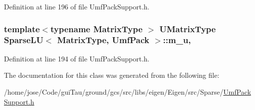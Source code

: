 Definition at line 196 of file Umf\-Pack\-Support.\-h.

\hypertarget{class_sparse_l_u_3_01_matrix_type_00_01_umf_pack_01_4_a59093788300b1912865d3b5d4e492ff6}{
\subsubsection[{m\-\_\-u}]{\setlength{\rightskip}{0pt plus 5cm}template$<$typename Matrix\-Type $>$ {\bf U\-Matrix\-Type} {\bf Sparse\-L\-U}$<$ Matrix\-Type, {\bf Umf\-Pack} $>$\-::m\-\_\-u\hspace{0.3cm}{\ttfamily [mutable]}, {\ttfamily [protected]}}}\label{class_sparse_l_u_3_01_matrix_type_00_01_umf_pack_01_4_a59093788300b1912865d3b5d4e492ff6}


Definition at line 194 of file Umf\-Pack\-Support.\-h.



The documentation for this class was generated from the following file\-:\begin{DoxyCompactItemize}
\item 
/home/jose/\-Code/gui\-Tau/ground/gcs/src/libs/eigen/\-Eigen/src/\-Sparse/\hyperlink{_umf_pack_support_8h}{Umf\-Pack\-Support.\-h}\end{DoxyCompactItemize}
